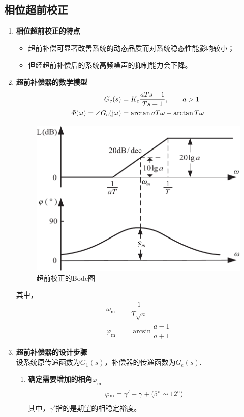 \subsection{相位超前校正}\vspace*{-0.5em}
\begin{enumerate}[1. ]
	\item \textbf{相位超前校正的特点}\vspace*{-0.5em}
	\begin{itemize}
		\item 超前补偿可显著改善系统的动态品质而对系统稳态性能影响较小；
		\item 但经超前补偿后的系统高频噪声的抑制能力会下降。
	\end{itemize}

	\item \textbf{超前补偿器的数学模型}
	\begin{align}
		G_{\text{c}}(s) &= K_c \dfrac{aTs + 1}{Ts + 1},\quad \quad a>1\\
		\varPhi(\omega) = \angle G_{\text{c}}(\text{j} \omega) &= \arctan aT\omega - \arctan T\omega
	\end{align}

\begin{figure}[!htb]
	\centering
	\includegraphics[width=0.55\linewidth]{pic/超前bode.pdf}
	\vspace*{-1em}
	\caption{超前校正的Bode图}
	\label{超前Bode}
\end{figure}
其中，
\begin{align}
	\omega_\text{m} &= \dfrac{1}{T \sqrt{a}}\\
	\varphi_\text{m} &= \arcsin \dfrac{a - 1}{a + 1}
\end{align}

	\item \textbf{超前补偿器的设计步骤}\\
	设系统原传递函数为$G_1(s)$，补偿器的传递函数为$G_\text{c}(s)$.\vspace*{-0.5em}
	\begin{enumerate}[\textbf{步骤} 1 ]
		\item \textbf{确定需要增加的相角}$\varphi_{\text{m}}$
		\begin{equation}
			\varphi_{\text{m}} = \gamma' - \gamma +(5{}^{\circ} \sim 12 {}^{\circ})
		\end{equation}
		其中，$\gamma'$指的是期望的相稳定裕度。
		

\end{enumerate}
\end{enumerate}
